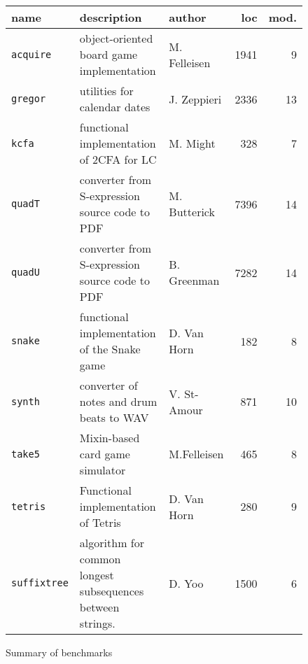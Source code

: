 
\begin{figure*} \footnotesize
\begin{tabular}{p{1.4cm} | p{6.9cm} | p{2.0cm} | r | r}
             {\bf  name} & {\bf description} & {\bf author} & {\bf loc} & {\bf mod.} \\ \hline

\texttt{acquire} & object-oriented board game implementation      & M. Felleisen & 1941 & 9 \\ \hline

\texttt{gregor}  & utilities for calendar dates                   & J. Zeppieri  & 2336 & 13\\ \hline

\texttt{kcfa}    & functional implementation of 2CFA for LC       & M. Might & 328 & 7\\ \hline

\texttt{quadT}   & converter from S-expression source code to PDF & M. Butterick & 7396 & 14\\ \hline

\texttt{quadU}   & converter from S-expression source code to PDF & B. Greenman  & 7282 & 14 \\ \hline

\texttt{snake}   & functional implementation of the Snake game    & D. Van Horn & 182 & 8 \\ \hline

\texttt{synth}  & converter of notes and drum beats to WAV & V. St-Amour & 871 & 10 \\ \hline

\texttt{take5} & Mixin-based card game simulator & M.Felleisen & 465 & 8\\ \hline

\texttt{tetris} & Functional implementation of Tetris & D. Van Horn &   280 & 9 \\ \hline

\texttt{suffix\-tree} & algorithm for common longest subsequences between strings. & D. Yoo & 1500 & 6 \\ 

\end{tabular}

\caption{Summary of benchmarks} \label{table:benchmark-descriptions}

\end{figure*}

